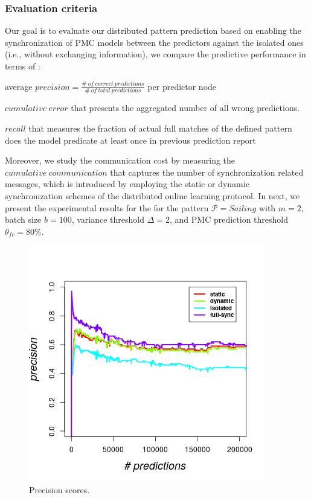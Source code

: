\subsubsection*{Evaluation criteria} Our goal is to evaluate our distributed pattern prediction based on enabling the synchronization of PMC models between the predictors against the isolated ones (i.e., without exchanging information), we compare the predictive performance in terms of :
\begin{enumerate*}[label=(\roman*)]
	
\item  average $\mathit{precision = \frac{\#\ of\ correct\ predictions}{\#\ of\ total\ predictions}}$ per predictor node

\item $\mathit{cumulative\ error}$ that presents the aggregated number of all wrong predictions.

\item $\mathit{recall}$ that measures the fraction of actual full matches of the defined pattern does the model predicate at least once in previous prediction report

\end{enumerate*} 
Moreover, we study the communication cost by measuring the $\mathit{cumulative\ communication}$ that captures the number of  synchronization related messages, which is introduced by employing the static or dynamic synchronization schemes of the distributed online learning protocol. In next, we present the experimental results for the for the pattern  $\mathcal{P}=Sailing$ with $m=2$, batch size $b=100$,  variance threshold $\Delta=2$, and PMC prediction threshold $\theta_{fc}=80\%$.

\begin{figure}[]
	
	\includegraphics[width=.5\textwidth]{figures/precision.png}
	
	\caption{Precision scores.}
	\label{fig:precsions}
\end{figure}

